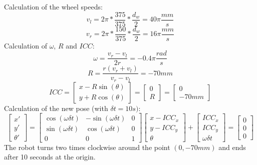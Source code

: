 \documentclass[paper=a4, fontsize=11pt]{scrartcl} %
\begin{document}
Calculation of the wheel speeds:
\begin{equation}
    v_l = 2\pi * \frac{375}{375} * \frac{d_w}{2} = 40\pi \frac{mm}{s}
\end{equation}
\begin{equation}
    v_r = 2\pi * \frac{150}{375} * \frac{d_w}{2} = 16\pi \frac{mm}{s}
\end{equation}
Calculation of $ \omega $, $ R $ and $ ICC $:
\begin{equation}
    \omega = \frac{v_r - v_l}{2r} = -0.4\pi \frac{rad}{s}
\end{equation}
\begin{equation}
    R = \frac{r(v_r + v_l)}{v_r - v_l} = -70 mm
\end{equation}
\begin{equation}
    ICC = \begin{bmatrix}
        x - R\sin(\theta)\\
        y + R\cos(\theta)
    \end{bmatrix} = \begin{bmatrix}
        0\\
        R
    \end{bmatrix} = \begin{bmatrix}
        0\\
        -70 mm
    \end{bmatrix}
\end{equation}
Calculation of the new pose (with $ \delta t = 10 s) $:
\begin{equation}
    \begin{bmatrix}
        x'\\
        y'\\
        \theta'
    \end{bmatrix}
    = \begin{bmatrix}
        \cos(\omega \delta t) & -\sin(\omega \delta t) & 0\\
        \sin(\omega \delta t) & \cos(\omega \delta t) & 0\\
        0 & 0 & 1
    \end{bmatrix}
    \begin{bmatrix}
        x - ICC_x\\
        y - ICC_y\\
        \theta
    \end{bmatrix}
    + \begin{bmatrix}
        ICC_x\\
        ICC_y\\
        \omega \delta t
    \end{bmatrix}
    = \begin{bmatrix}
        0\\
        0\\
        0
    \end{bmatrix}
\end{equation}
The robot turns two times clockwise around the point $ (0, -70 mm) $ and ends
after 10 seconds at the origin.
\end{document}
